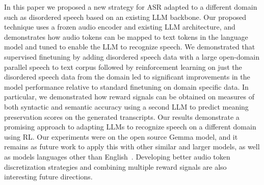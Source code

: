 \documentclass[conference]{IEEEtran}
\begin{document}
In this paper we proposed a new strategy for ASR adapted to a different domain such as disordered speech based on an existing LLM backbone. Our proposed technique uses a frozen audio encoder and existing LLM architecture, and demonstrates how audio tokens can be mapped to text tokens in the language model and tuned to enable the LLM to recognize speech. We demonstrated that supervised finetuning by adding disordered speech data with a large open-domain parallel speech to text corpus followed by reinforcement learning on just the disordered speech data from the domain led to significant improvements in the model performance relative to standard finetuning on domain specific data. In particular, we demonstrated how reward signals can be obtained on measures of both syntactic and semantic accuracy using a second LLM to predict meaning preservation scores on the generated transcripts. Our results demonstrate a promising approach to adapting LLMs to recognize speech on a different domain using RL. Our experiments were on the open source Gemma model, and it remains as future work to apply this with other similar and larger models, as well as models languages other than English~\cite{jiang2024mixtral,nakamura2024aurora}. %
Developing better audio token discretization strategies and combining multiple reward signals are also interesting future directions.



%

%

%
%
%
%
%

\newpage



\end{document}
